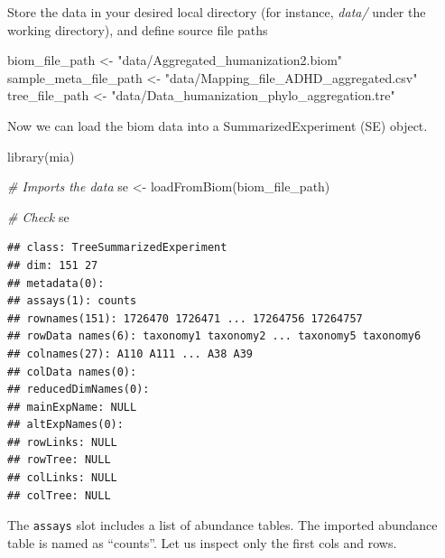 \documentclass[
]{book}
\newenvironment{Shaded}{\begin{snugshade}}{\end{snugshade}}
\newcommand{\CommentTok}[1]{\textcolor[rgb]{0.56,0.35,0.01}{\textit{#1}}}
\newcommand{\DecValTok}[1]{\textcolor[rgb]{0.00,0.00,0.81}{#1}}
\newcommand{\FunctionTok}[1]{\textcolor[rgb]{0.00,0.00,0.00}{#1}}
\newcommand{\NormalTok}[1]{#1}
\newcommand{\OtherTok}[1]{\textcolor[rgb]{0.56,0.35,0.01}{#1}}
\newcommand{\SpecialCharTok}[1]{\textcolor[rgb]{0.00,0.00,0.00}{#1}}
\newcommand{\StringTok}[1]{\textcolor[rgb]{0.31,0.60,0.02}{#1}}
\begin{document}
Store the data in your desired local directory (for instance, \emph{data/} under the
working directory), and define source file paths

\begin{Shaded}
\begin{Highlighting}[]
\NormalTok{biom\_file\_path }\OtherTok{\textless{}{-}} \StringTok{"data/Aggregated\_humanization2.biom"}
\NormalTok{sample\_meta\_file\_path }\OtherTok{\textless{}{-}} \StringTok{"data/Mapping\_file\_ADHD\_aggregated.csv"}
\NormalTok{tree\_file\_path }\OtherTok{\textless{}{-}} \StringTok{"data/Data\_humanization\_phylo\_aggregation.tre"}
\end{Highlighting}
\end{Shaded}

Now we can load the biom data into a SummarizedExperiment (SE) object.

\begin{Shaded}
\begin{Highlighting}[]
\FunctionTok{library}\NormalTok{(mia)}

\CommentTok{\# Imports the data}
\NormalTok{se }\OtherTok{\textless{}{-}} \FunctionTok{loadFromBiom}\NormalTok{(biom\_file\_path)}

\CommentTok{\# Check}
\NormalTok{se}
\end{Highlighting}
\end{Shaded}

\begin{verbatim}
## class: TreeSummarizedExperiment 
## dim: 151 27 
## metadata(0):
## assays(1): counts
## rownames(151): 1726470 1726471 ... 17264756 17264757
## rowData names(6): taxonomy1 taxonomy2 ... taxonomy5 taxonomy6
## colnames(27): A110 A111 ... A38 A39
## colData names(0):
## reducedDimNames(0):
## mainExpName: NULL
## altExpNames(0):
## rowLinks: NULL
## rowTree: NULL
## colLinks: NULL
## colTree: NULL
\end{verbatim}

The \texttt{assays} slot includes a list of abundance tables. The imported
abundance table is named as ``counts''. Let us inspect only the first
cols and rows.

\begin{Shaded}
\end{Shaded}
\end{document}

